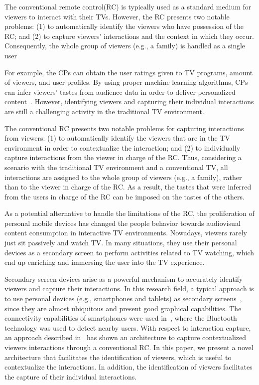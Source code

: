\documentclass[conference,a4paper]{IEEEtran}
\begin{document}
The conventional remote control(RC) is typically used as a standard medium for viewers to interact with their TVs. However, the RC presents two notable problems: (1) to automatically identify the viewers who have possession of the RC; and (2) to capture viewers' interactions and the context in which they occur. Consequently, the whole group of viewers (e.g., a family) is handled as a single user %

For example, the CPs can obtain the user ratings given to TV programs, amount of viewers, and user profiles. By using proper machine learning algorithms, CPs can infer viewers' tastes from audience data in order to deliver personalized content~\cite{Kim2012,Shin2009}. However, identifying viewers and capturing their individual interactions are still a challenging activity in the traditional TV environment.

The conventional RC presents two notable problems for capturing interactions from viewers: (1) to automatically identify the viewers that are in the TV environment in order to contextualize the interaction; and (2) to individually capture interactions from the viewer in charge of the RC. Thus, considering a scenario with the traditional TV environment and a conventional TV, all interactions are assigned to the whole group of viewers (e.g., a family), rather than to the viewer in charge of the RC. As a result, the tastes that were inferred from the users in charge of the RC can be imposed on the tastes of the others.

As a potential alternative to handle the limitations of the RC, the proliferation of personal mobile devices has changed the people behavior towards audiovisual content consumption in interactive TV environments. Nowadays, viewers rarely just sit passively and watch TV. In many situations, they use their personal devices as a secondary screen to perform activities related to TV watching, which end up enriching and immersing the user into the TV experience. 

Secondary screen devices arise as a powerful mechanism to accurately identify viewers and  capture their interactions. In this research field, a typical approach is to use personal devices (e.g., smartphones and tablets) as secondary screens~\cite{Courtois2012}, since they are almost ubiquitous and present good graphical capabilities. The connectivity capabilities of smartphones were used in~\cite{Cabarcos2011}, where the Bluetooth technology was used to detect nearby users. With respect to interaction capture, an approach described in~\cite{Teixeira2010} has shown an architecture to capture contextualized viewers interactions through a conventional RC. In this paper, we present a novel architecture that facilitates the identification of viewers, which is useful to contextualize the interactions. In addition, the identification of viewers facilitates the capture of their individual interactions.
\end{document}
